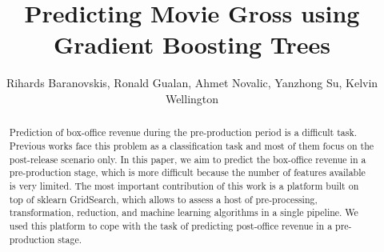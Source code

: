 \documentclass[sigconf]{acmart}
\begin{document}
\title{Predicting Movie Gross using Gradient Boosting Trees}
\author{Rihards Baranovskis, Ronald  Gualan, Ahmet Novalic, Yanzhong Su, Kelvin Wellington }


\begin{abstract}
Prediction of box-office revenue during the pre-production period is a difficult task. Previous works face this problem as a classification task and most of them focus on the post-release scenario only. In this paper, we aim to predict the box-office revenue in a pre-production stage, which is more difficult because the number of features available is very limited. The most important contribution of this work is a platform built on top of sklearn GridSearch, which allows to assess a host of pre-processing, transformation, reduction, and machine learning algorithms in a single pipeline. We used this platform to cope with the task of predicting post-office revenue in a pre-production stage. 
\end{abstract}


\maketitle




 
\end{document}

